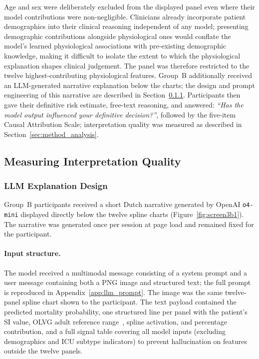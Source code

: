 \documentclass[12pt, a4paper]{article}
\begin{document}
Age and
sex were deliberately excluded from the displayed panel even where their
model contributions were non-negligible. Clinicians already incorporate
patient demographics into their clinical reasoning independent of any
model; presenting demographic contributions alongside physiological ones
would conflate the model's learned physiological associations with
pre-existing demographic knowledge, making it difficult to isolate the
extent to which the physiological explanation shapes clinical judgement.
The panel was therefore restricted to the twelve highest-contributing
physiological features. Group~B additionally received an LLM-generated narrative explanation
below the charts; the design and prompt engineering of this narrative are
described in Section~\ref{sec:llm_design}. Participants then gave
their definitive risk estimate, free-text reasoning, and answered:
\emph{``Has the model output influenced your definitive decision?''}, followed
by the five-item Causal Attribution Scale; interpretation quality was
measured as described in Section~\ref{sec:method_analysis}.

\subsection{Measuring Interpretation Quality}
\label{sec:method_prompts}

\subsubsection{LLM Explanation Design}
\label{sec:llm_design}

Group~B participants received a short Dutch narrative generated by
OpenAI \texttt{o4-mini} displayed directly below the twelve spline
charts (Figure~\ref{fig:screen3b1}). The narrative was generated once
per session at page load and remained fixed for the participant.

\paragraph*{Input structure.}
The model received a multimodal message consisting of a system prompt
and a user message containing both a PNG image and structured text;
the full prompt is reproduced in Appendix~\ref{app:llm_prompt}. The
image was the same twelve-panel spline chart shown to the participant.
The text payload contained the predicted mortality probability, one
structured line per panel with the patient's SI value, OLVG adult
reference range~\citep{olvg2024}, spline activation, and percentage
contribution, and a full signal table covering all model inputs
(excluding demographics and ICU subtype indicators) to prevent
hallucination on features outside the twelve panels.
\end{document}
